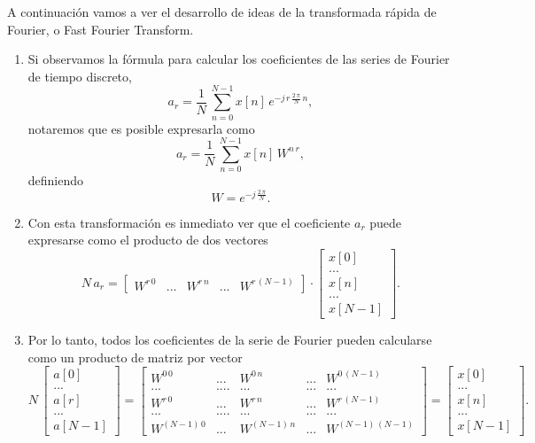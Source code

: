 A continuación vamos a ver el desarrollo de ideas de la transformada rápida de Fourier, o 
Fast Fourier Transform.

\begin{enumerate}
\item Si observamos la f\'{o}rmula para calcular los coeficientes de las series de Fourier de tiempo discreto,
\begin{equation}
   a_{r} =  \frac{1}{N} \, \sum_{n=0}^{N-1}x\left[ n\right] \, e^{-j \, r \, \frac{2 \, \pi}{N} \, n},
\end{equation}
notaremos que es posible expresarla como
\begin{equation}
   a_{r} =  \frac{1}{N} \, \sum_{n=0}^{N-1}x\left[ n\right] \, W^{n \, r},
\end{equation}
definiendo
\begin{equation}
  W = e^{-j \, \frac{2 \, \pi}{N}}.
\end{equation}

\item Con esta transformaci\'{o}n es inmediato ver que el coeficiente $a_{r}$ puede expresarse como el producto de dos vectores
\begin{equation}
N \, a_{r} =
\left[\begin{array}{ccccc}
W^{r \, 0} & ... & W^{r \, n} & ... & W^{r \, (N-1)}
\end{array} \right] \cdot 
\left[\begin{array}{c}
x[0]\\
... \\
x[n]\\
... \\
x[N-1]
\end{array} \right].
\end{equation}

\item Por lo tanto, todos los coeficientes de la serie de Fourier pueden calcularse como un producto de 
matriz por vector
\begin{equation}
N \, \left[ \begin{array}{c}
a[0] \\
... \\
a[r] \\
... \\
a[N-1]
\end{array} \right] =
\left[ \begin{array}{cccccc}
W^{0 \, 0} & ... & W^{0 \, n} & ... & W^{0 \, (N-1)} \\
... & .... & ... & ... & ... \\
W^{r \, 0} & ... & W^{r \, n} & ... & W^{r \, (N-1)} \\
... & .... & ... & ... & ... \\
W^{(N-1) \, 0} & ... & W^{(N-1) \, n} & ... & W^{(N-1) \, (N-1)}
\end{array} \right] =
\left[\begin{array}{c}
x[0]\\
... \\
x[n]\\
... \\
x[N-1]
\end{array} \right].
\end{equation}


\end{enumerate}
